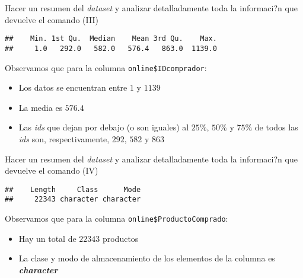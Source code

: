 \documentclass[
  ignorenonframetext,
]{beamer}
\newenvironment{Shaded}{\begin{snugshade}}{\end{snugshade}}
\newcommand{\KeywordTok}[1]{\textcolor[rgb]{0.13,0.29,0.53}{\textbf{#1}}}
\newcommand{\NormalTok}[1]{#1}
\newcommand{\OperatorTok}[1]{\textcolor[rgb]{0.81,0.36,0.00}{\textbf{#1}}}
\providecommand{\tightlist}{%
  \setlength{\itemsep}{0pt}\setlength{\parskip}{0pt}}
\begin{document}
\begin{frame}[fragile]{Hacer un resumen del \emph{dataset} y analizar
detalladamente toda la informaci?n que devuelve el comando (III)}
\protect\hypertarget{hacer-un-resumen-del-dataset-y-analizar-detalladamente-toda-la-informacin-que-devuelve-el-comando-iii}{}

\begin{Shaded}
\end{Shaded}

\begin{verbatim}
##    Min. 1st Qu.  Median    Mean 3rd Qu.    Max. 
##     1.0   292.0   582.0   576.4   863.0  1139.0
\end{verbatim}

Observamos que para la columna \texttt{online\$IDcomprador}:

\begin{itemize}
\tightlist
\item
  Los datos se encuentran entre \(1\) y \(1139\)
\item
  La media es \(576.4\)
\item
  Las \emph{ids} que dejan por debajo (o son iguales) al \(25\%\),
  \(50\%\) y \(75\%\) de todos las \emph{ids} son, respectivamente,
  \(292\), \(582\) y \(863\)
\end{itemize}

\end{frame}

\begin{frame}[fragile]{Hacer un resumen del \emph{dataset} y analizar
detalladamente toda la informaci?n que devuelve el comando (IV)}
\protect\hypertarget{hacer-un-resumen-del-dataset-y-analizar-detalladamente-toda-la-informacin-que-devuelve-el-comando-iv}{}

\begin{Shaded}
\end{Shaded}

\begin{verbatim}
##    Length     Class      Mode 
##     22343 character character
\end{verbatim}

Observamos que para la columna \texttt{online\$ProductoComprado}:

\begin{itemize}
\tightlist
\item
  Hay un total de \(22343\) productos
\item
  La clase y modo de almacenamiento de los elementos de la columna es
  \textbf{\emph{character}}
\end{itemize}

\end{frame}
\end{document}
